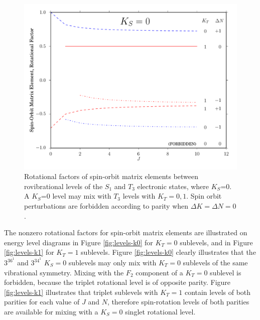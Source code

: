 \documentclass[12pt]{mitthesis}
\begin{document}
\begin{figure}
  \caption{Rotational factors of spin-orbit matrix elements between
    rovibrational levels of the $S_1$ and $T_3$ electronic states,
    where $K_S$=0.  A $K_S$=0 level may mix with $T_3$ levels with
    $K_T=0,1$.  Spin orbit perturbations are forbidden according to
    parity when $\Delta K = \Delta N = 0$.}
  \label{fig:rotational-factors}
  \centering
  \includegraphics[width=6in]{rotational-factors-k0.pdf}
\end{figure}


The nonzero rotational factors for spin-orbit matrix elements are
illustrated on energy level diagrams in Figure \ref{fig:levels-k0} for
$K_T=0$ sublevels, and in Figure \ref{fig:levels-k1} for $K_T=1$
sublevels.  Figure \ref{fig:levels-k0} clearly illustrates that the
$3^36^1$ and $3^34^1$ $K_S=0$ sublevels may only mix with $K_T=0$
sublevels of the same vibrational symmetry.  Mixing with the $F_2$
component of a $K_T=0$ sublevel is forbidden, because the triplet
rotational level is of opposite parity.  Figure \ref{fig:levels-k1}
illustrates that triplet sublevels with $K_T=1$ contain levels of both
parities for each value of $J$ and $N$, therefore spin-rotation levels
of both parities are available for mixing with a $K_S=0$ singlet
rotational level.

\end{document}
